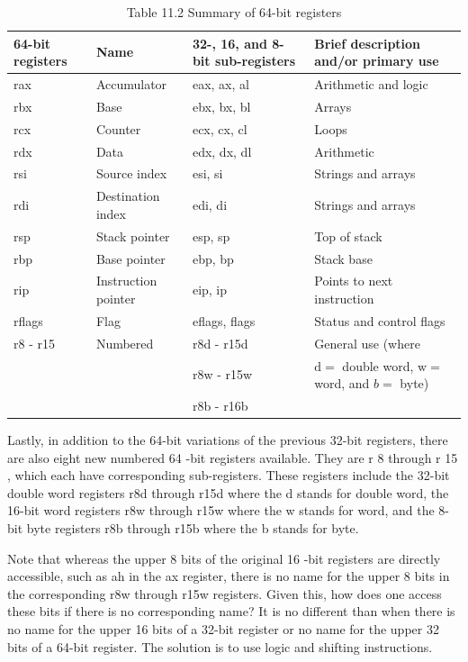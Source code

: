 \documentclass[10pt]{article}
\begin{document}
\begin{table}[h]
\begin{center}
\captionsetup{labelformat=empty}
\caption{Table 11.2 Summary of 64-bit registers}
\begin{tabular}{|l|l|l|l|}
\hline
64-bit registers & Name & 32-, 16, and 8-bit sub-registers & Brief description and/or primary use \\
\hline
rax & Accumulator & eax, ax, al & Arithmetic and logic \\
\hline
rbx & Base & ebx, bx, bl & Arrays \\
\hline
rcx & Counter & ecx, cx, cl & Loops \\
\hline
rdx & Data & edx, dx, dl & Arithmetic \\
\hline
rsi & Source index & esi, si & Strings and arrays \\
\hline
rdi & Destination index & edi, di & Strings and arrays \\
\hline
rsp & Stack pointer & esp, sp & Top of stack \\
\hline
rbp & Base pointer & ebp, bp & Stack base \\
\hline
rip & Instruction pointer & eip, ip & Points to next instruction \\
\hline
rflags & Flag & eflags, flags & Status and control flags \\
\hline
r8 - r15 & Numbered & r8d - r15d & General use (where \\
\hline
 &  & r8w - r15w & $\mathrm{d}=$ double word, $\mathrm{w}=$ word, and $b=$ byte) \\
\hline
 &  & r8b - r16b &  \\
\hline
\end{tabular}
\end{center}
\end{table}

Lastly, in addition to the 64-bit variations of the previous 32-bit registers, there are also eight new numbered 64 -bit registers available. They are r 8 through r 15 , which each have corresponding sub-registers. These registers include the 32-bit double word registers r8d through r15d where the d stands for double word, the 16-bit word registers r8w through r15w where the w stands for word, and the 8-bit byte registers r8b through r15b where the b stands for byte.

Note that whereas the upper 8 bits of the original 16 -bit registers are directly accessible, such as ah in the ax register, there is no name for the upper 8 bits in the corresponding r8w through r15w registers. Given this, how does one access these bits if there is no corresponding name? It is no different than when there is no name for the upper 16 bits of a 32-bit register or no name for the upper 32 bits of a 64-bit register. The solution is to use logic and shifting instructions.
\end{document}
